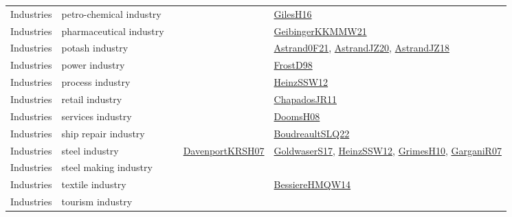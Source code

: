 {\begin{longtable}{lp{3cm}>{\raggedright}p{6cm}>{\raggedright}p{6cm}p{8cm}}
Industries & petro-chemical industry &  &  & \href{papers/GilesH16.pdf}{GilesH16}\cite{GilesH16}\\
Industries & pharmaceutical industry &  &  & \href{papers/GeibingerKKMMW21.pdf}{GeibingerKKMMW21}\cite{GeibingerKKMMW21}\\
Industries & potash industry &  &  & \href{papers/Astrand0F21.pdf}{Astrand0F21}\cite{Astrand0F21}, \href{articles/AstrandJZ20.pdf}{AstrandJZ20}\cite{AstrandJZ20}, \href{papers/AstrandJZ18.pdf}{AstrandJZ18}\cite{AstrandJZ18}\\
Industries & power industry &  &  & \href{papers/FrostD98.pdf}{FrostD98}\cite{FrostD98}\\
Industries & process industry &  &  & \href{articles/HeinzSSW12.pdf}{HeinzSSW12}\cite{HeinzSSW12}\\
Industries & retail industry &  &  & \href{papers/ChapadosJR11.pdf}{ChapadosJR11}\cite{ChapadosJR11}\\
Industries & services industry &  &  & \href{papers/DoomsH08.pdf}{DoomsH08}\cite{DoomsH08}\\
Industries & ship repair industry &  &  & \href{papers/BoudreaultSLQ22.pdf}{BoudreaultSLQ22}\cite{BoudreaultSLQ22}\\
Industries & steel industry &  & \href{papers/DavenportKRSH07.pdf}{DavenportKRSH07}\cite{DavenportKRSH07} & \href{papers/GoldwaserS17.pdf}{GoldwaserS17}\cite{GoldwaserS17}, \href{articles/HeinzSSW12.pdf}{HeinzSSW12}\cite{HeinzSSW12}, \href{papers/GrimesH10.pdf}{GrimesH10}\cite{GrimesH10}, \href{papers/GarganiR07.pdf}{GarganiR07}\cite{GarganiR07}\\
Industries & steel making industry &  &  & \\
Industries & textile industry &  &  & \href{papers/BessiereHMQW14.pdf}{BessiereHMQW14}\cite{BessiereHMQW14}\\
Industries & tourism industry &  &  & \\

\end{longtable}}

